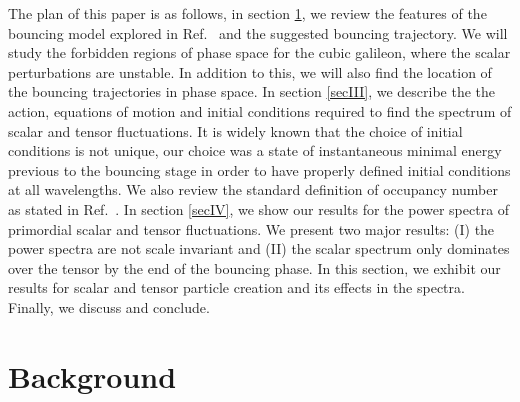 \documentclass[aps,prd,reprint,twocolumn,showpacs,nofootinbib,superscriptaddress,floatfix]{revtex4-1}
\begin{document}
The plan of this paper is as follows, in section \ref{secII}, we review the features of the bouncing model explored in Ref.~\cite{Ijjas:2016tpn} and the suggested bouncing trajectory. We will study the forbidden regions of phase space for the cubic galileon, where the scalar perturbations are unstable. In addition to this, we will also find the location of the bouncing trajectories in phase space. In section \ref{secIII}, we describe the the action, equations of motion and initial conditions required to find the spectrum of scalar and tensor fluctuations. It is widely known that the choice of initial conditions is not unique, our choice was a state of instantaneous minimal energy previous to the bouncing stage in order to have properly defined initial conditions at all wavelengths. We also review the standard definition of occupancy number as stated in Ref.~\cite{Barnaby:2010ke}. In section \ref{secIV}, we show our results for the power spectra of primordial scalar and tensor fluctuations. We present two major results: (I) the power spectra are not scale invariant and (II) the scalar spectrum only dominates over the tensor by the end of the bouncing phase. In this section, we exhibit our results for scalar and tensor particle creation and its effects in the spectra. Finally, we discuss and conclude.      

\section{Background}\label{secII}
\end{document}
